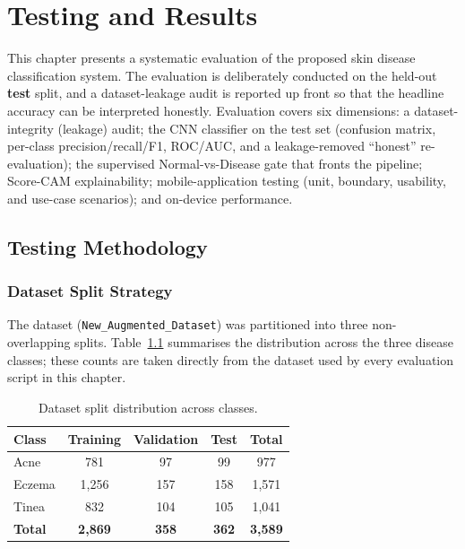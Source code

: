 \chapter{Testing and Results}

This chapter presents a systematic evaluation of the proposed skin disease
classification system. The evaluation is deliberately conducted on the held-out
\textbf{test} split, and a dataset-leakage audit is reported up front so that the
headline accuracy can be interpreted honestly. Evaluation covers six dimensions:
a dataset-integrity (leakage) audit; the CNN classifier on the test set
(confusion matrix, per-class precision/recall/F1, ROC/AUC, and a leakage-removed
``honest'' re-evaluation); the supervised Normal-vs-Disease gate that fronts the
pipeline; Score-CAM explainability; mobile-application testing (unit, boundary,
usability, and use-case scenarios); and on-device performance.

\section{Testing Methodology}

\subsection{Dataset Split Strategy}

The dataset (\texttt{New\_Augmented\_Dataset}) was partitioned into three
non-overlapping splits. Table~\ref{tab:dataset_splits} summarises the
distribution across the three disease classes; these counts are taken directly
from the dataset used by every evaluation script in this chapter.

\begin{table}[H]
\centering
\caption{Dataset split distribution across classes.}
\label{tab:dataset_splits}
\begin{tabular}{|l|c|c|c|c|}
\hline
\textbf{Class} & \textbf{Training} & \textbf{Validation} & \textbf{Test} & \textbf{Total} \\ \hline
Acne   &   781 &  97 &  99 &   977 \\ \hline
Eczema & 1{,}256 & 157 & 158 & 1{,}571 \\ \hline
Tinea  &   832 & 104 & 105 & 1{,}041 \\ \hline
\textbf{Total} & \textbf{2{,}869} & \textbf{358} & \textbf{362} & \textbf{3{,}589} \\ \hline
\end{tabular}
\end{table}

